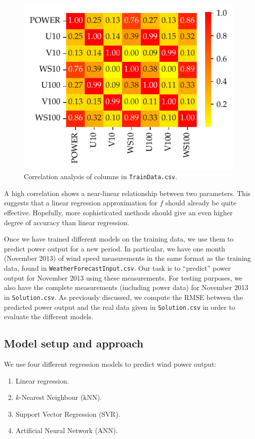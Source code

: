 \documentclass[11pt]{article}
\begin{document}
\begin{figure}
  \centering
  \includegraphics{figures/q1_corr_analysis.pdf}
  \caption{Correlation analysis of columns in \texttt{TrainData.csv}.}
  \label{fig:q1-corr-analysis}
\end{figure}

A high correlation shows a near-linear relationship between two parameters.
This suggests that a linear regression approximation for $f$ should already be quite effective.
Hopefully, more sophisticated methods should give an even higher degree of accuracy than linear regression.

Once we have trained different models on the training data, we use them to predict power output for a new period.
In particular, we have one month (November 2013) of wind speed measurements in the same format as the training data, found in \texttt{WeatherForecastInput.csv}.
Our task is to ``predict'' power output for November 2013 using these measurements.
For testing purposes, we also have the complete measurements (including power data) for November 2013 in \texttt{Solution.csv}.
As previously discussed, we compute the RMSE between the predicted power output and the real data given in \texttt{Solution.csv} in order to evaluate the different models.

\subsection*{Model setup and approach}

We use four different regression models to predict wind power output:
\begin{enumerate}
\item
  Linear regression.
\item
  $k$-Nearest Neighbour (kNN).
\item
  Support Vector Regression (SVR).
\item
  Artificial Neural Network (ANN).
\end{enumerate}
\end{document}
